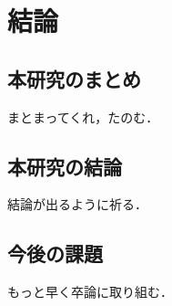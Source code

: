 \chapter{結論}
\label{chap:conclusion}

\section{本研究のまとめ}
\label{section:conclusion}

まとまってくれ，たのむ．

\section{本研究の結論}

結論が出るように祈る．

\section{今後の課題}

もっと早く卒論に取り組む．
